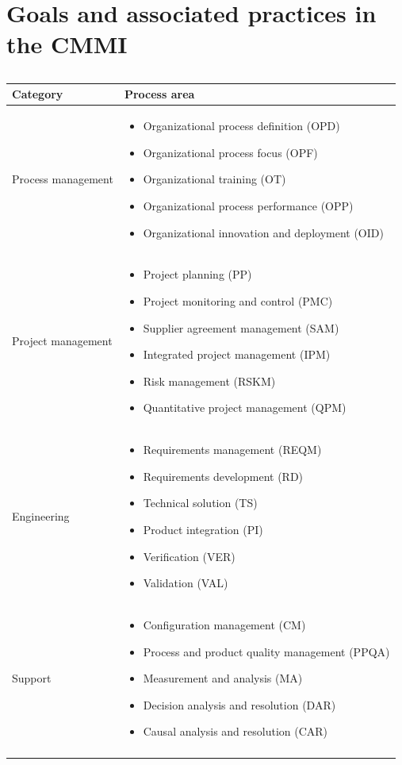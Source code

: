 \section{Goals and associated practices in the CMMI}
\begin{longtable}{ |p{3cm}|p{8cm}|  }
\hline
Category & Process area \\
\hline
\hline
Process management &
\begin{itemize}
\item Organizational process definition (OPD)
\item Organizational process focus (OPF)
\item Organizational training (OT)
\item Organizational process performance (OPP)
\item Organizational innovation and deployment (OID)
\end{itemize}\\
\hline
Project management &
\begin{itemize}
  \item Project planning (PP)
  \item Project monitoring and control (PMC)
  \item Supplier agreement management (SAM)
  \item Integrated project management (IPM)
  \item Risk management (RSKM)
  \item Quantitative project management (QPM)
\end{itemize}\\
\hline
Engineering &
\begin{itemize}
  \item Requirements management (REQM)
  \item Requirements development (RD)
  \item Technical solution (TS)
  \item Product integration (PI)
  \item Verification (VER)
  \item Validation (VAL)
\end{itemize}\\
\hline
Support &
\begin{itemize}
  \item Configuration management (CM)
  \item Process and product quality management (PPQA)
  \item Measurement and analysis (MA)
  \item Decision analysis and resolution (DAR)
  \item Causal analysis and resolution (CAR)
\end{itemize}\\
\hline
\caption{}
\label{table:T9_3}
\end{longtable}
\newpage
